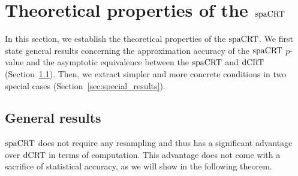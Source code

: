 \documentclass[12pt]{article}
\theoremstyle{definition}
\newcommand{\dCRT}{\textnormal{dCRT}} 					%
\newcommand{\spacrt}{\textnormal{spaCRT}}               %
\begin{document}
\section{Theoretical properties of the $\spacrt$}\label{sec:theory}

In this section, we establish the theoretical properties of the $\spacrt$. We first state general results concerning the approximation accuracy of the $\spacrt$ $p$-value and the asymptotic equivalence between the $\spacrt$ and $\dCRT$ (Section~\ref{sec:general_results}). Then, we extract simpler and more concrete conditions in two special cases (Section~\ref{sec:special_results}). 

\subsection{General results}\label{sec:general_results}


$\spacrt$ does not require any resampling and thus has a significant advantage over $\dCRT$ in terms of computation. This advantage does not come with a sacrifice of statistical accuracy, as we will show in the following theorem.
\end{document}
